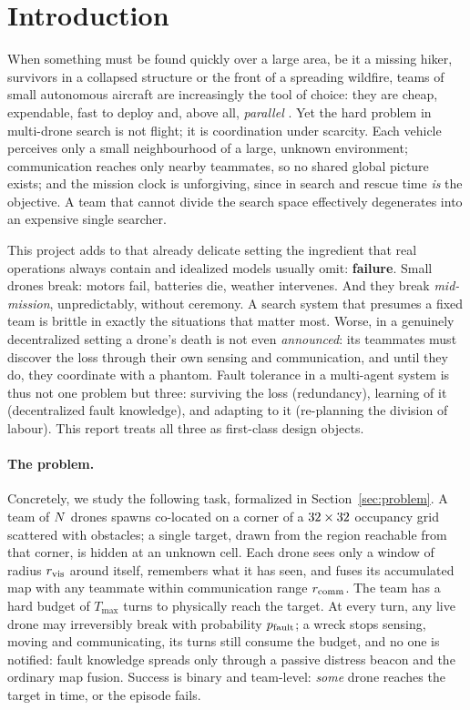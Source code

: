 \section{Introduction}
\label{sec:introduction}

When something must be found quickly over a large area, be it a missing hiker,
survivors in a collapsed structure or the front of a spreading wildfire, teams of
small autonomous aircraft are increasingly the tool of choice: they are cheap,
expendable, fast to deploy and, above all, \emph{parallel}
\citep{queralta2020collaborative,julian2019distributed}. Yet the hard problem in
multi-drone search is not flight; it is coordination under scarcity. Each vehicle
perceives only a small neighbourhood of a large, unknown environment;
communication reaches only nearby teammates, so no shared global picture exists;
and the mission clock is unforgiving, since in search and rescue time \emph{is}
the objective. A team that cannot divide the search space effectively degenerates
into an expensive single searcher.

This project adds to that already delicate setting the ingredient that real
operations always contain and idealized models usually omit: \textbf{failure}.
Small drones break: motors fail, batteries die, weather intervenes. And they
break \emph{mid-mission}, unpredictably, without ceremony. A search system that
presumes a fixed team is brittle in exactly the situations that matter most.
Worse, in a genuinely decentralized setting a drone's death is not even
\emph{announced}: its teammates must discover the loss through their own sensing
and communication, and until they do, they coordinate with a phantom. Fault
tolerance in a multi-agent system is thus not one problem but three: surviving
the loss (redundancy), learning of it (decentralized fault knowledge), and
adapting to it (re-planning the division of labour). This report treats all three
as first-class design objects.

\paragraph{The problem.}
Concretely, we study the following task, formalized in
Section~\ref{sec:problem}. A team of $N$ drones spawns co-located on a
corner of a $32\times32$ occupancy grid scattered with obstacles;
a single target, drawn from the region reachable from that corner, is
hidden at an unknown cell. Each drone
sees only a window of radius $r_{\mathrm{vis}}$ around itself, remembers what it has seen,
and fuses its accumulated map with any teammate within communication range
$r_{\mathrm{comm}}$. The team has a hard budget of $T_{\max}$ turns to physically reach the
target. At every turn, any live drone may irreversibly break with probability
$p_{\mathrm{fault}}$; a wreck stops sensing, moving and communicating, its turns still
consume the budget, and no one is notified: fault knowledge spreads only through
a passive distress beacon and the ordinary map fusion. Success is binary and
team-level: \emph{some} drone reaches the target in time, or the episode fails.

